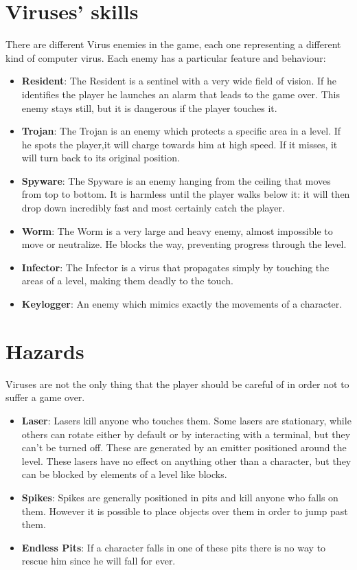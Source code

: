 \documentclass[12pt, a4paper]{report}
\begin{document}
\section*{Viruses' skills}
There are different Virus enemies in the game, each one representing a different kind of computer virus. Each enemy has a particular feature and behaviour:
\begin{itemize}
	\item \textbf{Resident}: The Resident is a sentinel with a very wide field of vision. If he identifies the player he launches an alarm that leads to the game 		over. This enemy stays still, but it is dangerous if the player touches it.
	\item \textbf{Trojan}: The Trojan is an enemy which protects a specific area in a level. If he spots the player,it will charge towards him at high speed. If it misses, it will turn back to its original position.
	\item \textbf{Spyware}: The Spyware is an enemy hanging from the ceiling that moves from top to bottom. It is harmless until the player walks below it: it will then drop down incredibly fast and most certainly catch the player.
	\item \textbf{Worm}: The Worm is a very large and heavy enemy, almost impossible to move or neutralize. He blocks the way, preventing progress through the level.
	\item \textbf{Infector}: The Infector is a virus that propagates simply by touching the areas of a level, making them deadly to the touch.
	\item \textbf{Keylogger}: An enemy which mimics exactly the movements of a character.
\end{itemize}


\section*{Hazards}
Viruses are not the only thing that the player should be careful of in order not to suffer a game over.
\begin{itemize}
	\item \textbf{Laser}: Lasers kill anyone who touches them. Some lasers are stationary, while others can rotate either by default or by interacting with a 			terminal, but they can't be turned off. These are generated by an emitter positioned around the level. These lasers have no effect on anything other than a character, but they can be blocked by elements of a level like blocks.
	\item \textbf{Spikes}: Spikes are generally positioned in pits and kill anyone who falls on them. However it is possible to place objects over them in order to jump past them.
	\item \textbf{Endless Pits}: If a character falls in one of these pits there is no way to rescue him since he will fall for ever.
\end{itemize}
\end{document}
